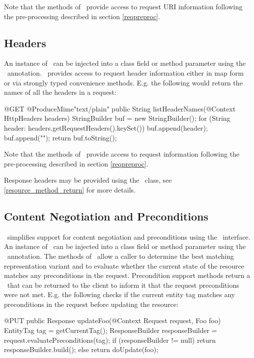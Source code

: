 Note that the methods of \UriInfo\ provide access to request URI information following the pre-processing described in section \ref{reqpreproc}.

\subsection{Headers}

An instance of \HttpHeaders\ can be injected into a class field or method parameter using the \Context\ annotation. \HttpHeaders\ provides access to request header information either in map form or via strongly typed convenience methods. E.g. the following would return the names of all the headers in a request:

\begin{listing}{1}
@GET
@ProduceMime{"text/plain"}
public String listHeaderNames(@Context HttpHeaders headers) {
  StringBuilder buf = new StringBuilder();
  for (String header: headers.getRequestHeaders().keySet()) {
    buf.append(header);
    buf.append("\n");
  }
  return buf.toString();
}
\end{listing}

Note that the methods of \HttpHeaders\ provide access to request information following the pre-processing described in section \ref{reqpreproc}.

Response headers may be provided using the \Response\ class, see \ref{resource_method_return} for more details.

\subsection{Content Negotiation and Preconditions}

\jaxrs\ simplifies support for content negotiation and preconditions using the \Request\ interface. An instance of \Request\ can be injected into a class field or method parameter using the \Context\ annotation. The methods of \Request\ allow a caller to determine the best matching representation variant and to evaluate whether the current state of the resource matches any preconditions in the request. Precondition support methods return a \ResponseBuilder\ that can be returned to the client to inform it that the request preconditions were not met. E.g. the following checks if the current entity tag matches any preconditions in the request before updating the resource:

\begin{listing}{1}
@PUT
public Response updateFoo(@Context Request request, Foo foo) {
	EntityTag tag = getCurrentTag();
	ResponseBuilder responseBuilder = request.evaluatePreconditions(tag);
	if (responseBuilder != null)
	  return responseBuilder.build();
	else
	  return doUpdate(foo);
}
\end{listing}


